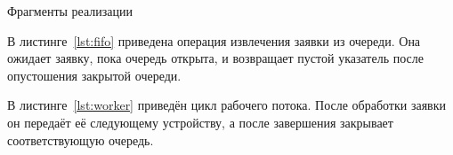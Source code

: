 \begin{center}Фрагменты реализации\end{center}
В листинге~\ref{lst:fifo} приведена операция извлечения заявки из очереди. Она ожидает заявку, пока очередь открыта, и возвращает пустой указатель после опустошения закрытой очереди.


В листинге~\ref{lst:worker} приведён цикл рабочего потока. После обработки заявки он передаёт её следующему устройству, а после завершения закрывает соответствующую очередь.


